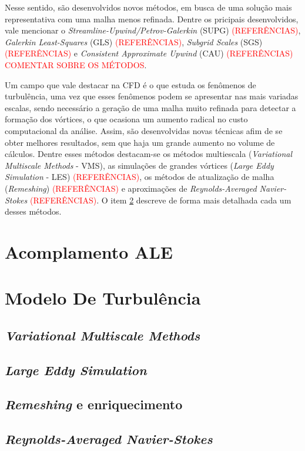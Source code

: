 \documentclass[_ArquivoPrincipal.tex]{subfiles}
\begin{document}
Nesse sentido, são desenvolvidos novos métodos, em busca de uma solução mais representativa com uma malha menos refinada. Dentre os pricipais desenvolvidos, vale mencionar o \textit{Streamline-Upwind/Petrov-Galerkin} (SUPG) \textcolor{red}{(REFERÊNCIAS)}, \textit{Galerkin Least-Squares} (GLS) \textcolor{red}{(REFERÊNCIAS)}, \textit{Subgrid Scales} (SGS) \textcolor{red}{(REFERÊNCIAS)} e \textit{Consistent Approximate Upwind} (CAU) \textcolor{red}{(REFERÊNCIAS)} \textcolor{red}{COMENTAR SOBRE OS MÉTODOS}.

Um campo que vale destacar na CFD é o que estuda os fenômenos de turbulência, uma vez que esses fenômenos podem se apresentar nas mais variadas escalas, sendo necessário a geração de uma malha muito refinada para detectar a formação dos vórtices, o que ocasiona um aumento radical no custo computacional da análise. Assim, são desenvolvidas novas técnicas afim de se obter melhores resultados, sem que haja um grande aumento no volume de cálculos. Dentre esses métodos destacam-se os métodos multiescala (\textit{Variational Multiscale Methods} - VMS), as simulações de grandes vórtices (\textit{Large Eddy Simulation} - LES) \textcolor{red}{(REFERÊNCIAS)}, os métodos de atualização de malha (\textit{Remeshing}) \textcolor{red}{(REFERÊNCIAS)} e aproximações de \textit{Reynolds-Averaged Navier-Stokes} \textcolor{red}{(REFERÊNCIAS)}. O item \ref{MT} descreve de forma mais detalhada cada um desses métodos.

\section{Acomplamento ALE} \label{ALE}

\section{Modelo De Turbulência} \label{MT}

\subsection{\textit{Variational Multiscale Methods}} \label{VMS}

\subsection{\textit{Large Eddy Simulation}} \label{LES}

\subsection{\textit{Remeshing} e enriquecimento} \label{ReE}

\subsection{\textit{Reynolds-Averaged Navier-Stokes}} \label{RANS}
\end{document}
